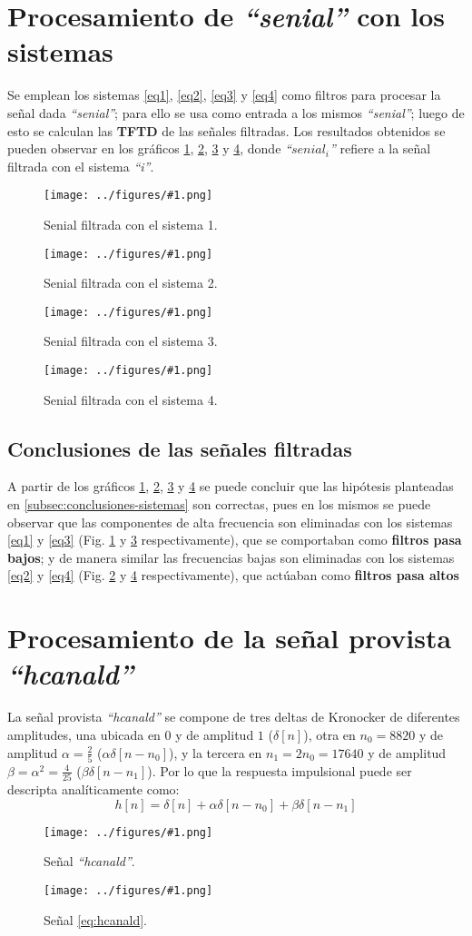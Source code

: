 \documentclass[letterpaper, 10 pt, conference]{ieeeconf}  %
\newcommand{\image}[2] {
  \begin{figure}[H]
    \centering
    \texttt{[image: ../figures/\#1.png]}
    \caption{#2}
    \label{fig:#1}
  \end{figure}
}
\begin{document}
\section{Procesamiento de \textit{``senial''} con los sistemas}
Se emplean los sistemas \ref{eq1}, \ref{eq2}, \ref{eq3} y \ref{eq4} como filtros para procesar la se\~nal dada \textit{``senial''}; para ello se usa como entrada a los mismos \textit{``senial''}; luego de esto se calculan las \textbf{TFTD} de las se\~nales filtradas. Los resultados obtenidos se pueden observar en los gr\'aficos \ref{fig:senial_filtrada_1}, \ref{fig:senial_filtrada_2}, \ref{fig:senial_filtrada_3} y \ref{fig:senial_filtrada_4}, donde \textit{``$senial_i$''} refiere a la señal  filtrada con el sistema \textit{``i''}.
\image{senial_filtrada_1}{Senial filtrada con el sistema 1.}
\image{senial_filtrada_2}{Senial filtrada con el sistema 2.}
\image{senial_filtrada_3}{Senial filtrada con el sistema 3.}
\image{senial_filtrada_4}{Senial filtrada con el sistema 4.}
\subsection{Conclusiones de las se\~nales filtradas}
A partir de los gr\'aficos \ref{fig:senial_filtrada_1}, \ref{fig:senial_filtrada_2}, \ref{fig:senial_filtrada_3} y \ref{fig:senial_filtrada_4} se puede concluir que las hip\'otesis planteadas en \ref{subsec:conclusiones-sistemas} son correctas, pues en los mismos se puede observar que las componentes de alta frecuencia son eliminadas con los sistemas \ref{eq1} y \ref{eq3} (Fig. \ref{fig:senial_filtrada_1} y \ref{fig:senial_filtrada_3} respectivamente), que se comportaban como \textbf{filtros pasa bajos}; y de manera similar las frecuencias bajas son eliminadas con los sistemas \ref{eq2} y \ref{eq4} (Fig. \ref{fig:senial_filtrada_2} y \ref{fig:senial_filtrada_4} respectivamente), que act\'uaban como \textbf{filtros pasa altos}

\section{Procesamiento de la se\~nal provista \textit{``hcanald''}}
La se\~nal provista \textit{``hcanald''} se compone de tres deltas de Kronocker de diferentes amplitudes, una ubicada en 0 y de amplitud $1$ ($\delta[n]$), otra en $n_0=8820$ y de amplitud $\alpha=\frac{2}{5}$ ($\alpha\delta[n-n_0]$), y la tercera en $n_1=2n_0=17640$ y de amplitud $\beta=\alpha^2=\frac{4}{25}$ ($\beta\delta[n-n_1]$). Por lo que la respuesta impulsional puede ser descripta anal\'iticamente como:
\begin{equation} \label{eq:hcanald}
  h[n] = \delta[n] + \alpha\delta[n-n_0] + \beta\delta[n-n_1]
\end{equation}
\image{hcanald}{Se\~nal \textit{``hcanald''}.}
\image{hcanald_analitica}{Se\~nal \ref{eq:hcanald}.}
\end{document}
